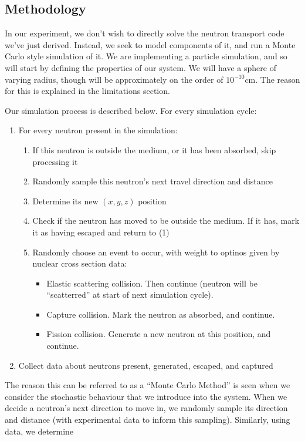 \subsection{Methodology}

In our experiment, we don't wish to directly solve the neutron transport code we've just derived. Instead, we seek to model components of it, 
and run a Monte Carlo style simulation of it. We are implementing a particle simulation, and so will start by defining the properties 
of our system. We will have a sphere of varying radius, though will be approximately on the order of $10^{-10}\text{cm}$. The reason for 
this is explained in the limitations section. 

Our simulation process is described below. For every simulation cycle:
\begin{enumerate}
    \item For every neutron present in the simulation:
    \begin{enumerate}
        \item If this neutron is outside the medium, or it has been absorbed, skip processing it
        \item Randomly sample this neutron's next travel direction and distance
        \item Determine its new $(x,y,z)$ position
        \item Check if the neutron has moved to be outside the medium. If it has, mark it as having escaped and return to (1)
        \item Randomly choose an event to occur, with weight to optinos given by nuclear cross section data:
        \begin{itemize}
            \item Elastic scattering collision. Then continue (neutron will be ``scatterred'' at start of next simulation cycle).
            \item Capture collision. Mark the neutron as absorbed, and continue.
            \item Fission collision. Generate a new neutron at this position, and continue.
        \end{itemize}
    \end{enumerate}
    \item Collect data about neutrons present, generated, escaped, and captured
\end{enumerate}

The reason this can be referred to as a ``Monte Carlo Method'' is seen when we consider the stochastic behaviour that we introduce into 
the system. When we decide a neutron's next direction to move in, we randomly sample its direction and distance (with experimental 
data to inform this sampling). Similarly, using data, we determine 

